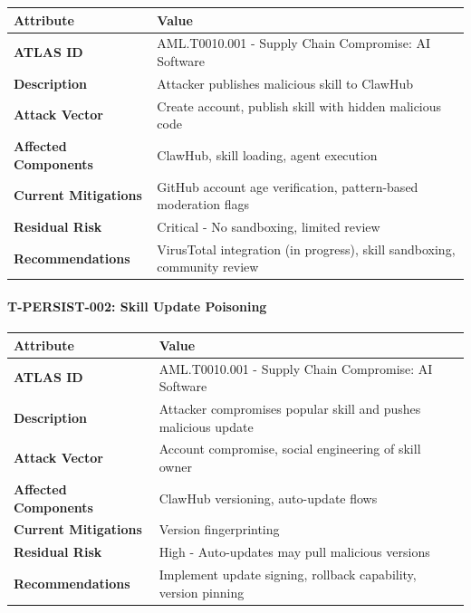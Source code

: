 \begin{table}[h]
\centering
\small
\begin{tabular}{|l|l|}
\hline
Attribute & Value \\
\hline
\textbf{ATLAS ID} & AML.T0010.001 - Supply Chain Compromise: AI Software \\
\hline
\textbf{Description} & Attacker publishes malicious skill to ClawHub \\
\hline
\textbf{Attack Vector} & Create account, publish skill with hidden malicious code \\
\hline
\textbf{Affected Components} & ClawHub, skill loading, agent execution \\
\hline
\textbf{Current Mitigations} & GitHub account age verification, pattern-based moderation flags \\
\hline
\textbf{Residual Risk} & Critical - No sandboxing, limited review \\
\hline
\textbf{Recommendations} & VirusTotal integration (in progress), skill sandboxing, community review \\
\hline
\end{tabular}
\end{table}



\paragraph{T-PERSIST-002: Skill Update Poisoning}



\begin{table}[h]
\centering
\small
\begin{tabular}{|l|l|}
\hline
Attribute & Value \\
\hline
\textbf{ATLAS ID} & AML.T0010.001 - Supply Chain Compromise: AI Software \\
\hline
\textbf{Description} & Attacker compromises popular skill and pushes malicious update \\
\hline
\textbf{Attack Vector} & Account compromise, social engineering of skill owner \\
\hline
\textbf{Affected Components} & ClawHub versioning, auto-update flows \\
\hline
\textbf{Current Mitigations} & Version fingerprinting \\
\hline
\textbf{Residual Risk} & High - Auto-updates may pull malicious versions \\
\hline
\textbf{Recommendations} & Implement update signing, rollback capability, version pinning \\
\hline
\end{tabular}
\end{table}



